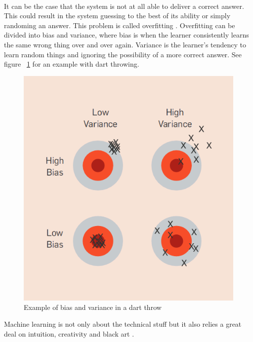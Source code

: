 \\[0.5cm]
It can be the case that the system is not at all able to deliver a correct answer. This could result in the system guessing to the best of its ability or simply randoming an answer. This problem is called overfitting \cite{18}. Overfitting can be divided into bias and variance, where bias is when the learner consistently learns the same wrong thing over and over again. Variance is the learner's tendency to learn random things and ignoring the possibility of a more correct answer. See figure ~\ref{fig:biasandvariance} for an example with dart throwing.
\begin{figure}[h!]
\centering
\includegraphics[width=0.5\linewidth,natwidth=898,natheight=587]{billeder/biasVSvariance.png}
\caption{Example of bias and variance in a dart throw \cite{18}}
\label{fig:biasandvariance}
\end{figure}

Machine learning is not only about the technical stuff but it also relies a great deal on intuition, creativity and  black art \cite{18}. 
